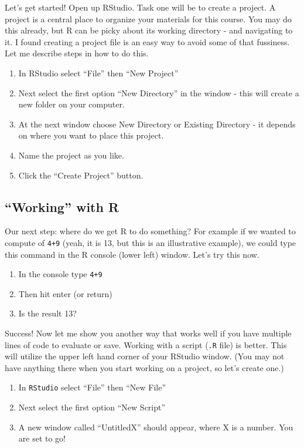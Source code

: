 \documentclass[
]{book}
\providecommand{\tightlist}{%
  \setlength{\itemsep}{0pt}\setlength{\parskip}{0pt}}
\theoremstyle{definition}
\theoremstyle{definition}
\theoremstyle{definition}
\theoremstyle{remark}
\begin{document}
Let's get started! Open up RStudio. Task one will be to create a project. A project is a central place to organize your materials for this course. You may do this already, but R can be picky about its working directory - and navigating to it. I found creating a project file is an easy way to avoid some of that fussiness. Let me describe steps in how to do this.

\begin{enumerate}
\def\labelenumi{\arabic{enumi}.}
\tightlist
\item
  In RStudio select ``File'' then ``New Project''
\item
  Next select the first option ``New Directory'' in the window - this will create a new folder on your computer.
\item
  At the next window choose New Directory or Existing Directory - it depends on where you want to place this project.
\item
  Name the project as you like.
\item
  Click the ``Create Project'' button.
\end{enumerate}

\hypertarget{working-with-r}{%
\subsection{``Working'' with R}\label{working-with-r}}

Our next step: where do we get R to do something? For example if we wanted to compute of \texttt{4+9} (yeah, it is 13, but this is an illustrative example), we could type this command in the R console (lower left) window. Let's try this now.

\begin{enumerate}
\def\labelenumi{\arabic{enumi}.}
\tightlist
\item
  In the console type \texttt{4+9}
\item
  Then hit enter (or return)
\item
  Is the result 13?
\end{enumerate}

Success! Now let me show you another way that works well if you have multiple lines of code to evaluate or save. Working with a script (\texttt{.R} file) is better. This will utilize the upper left hand corner of your RStudio window. (You may not have anything there when you start working on a project, so let's create one.)

\begin{enumerate}
\def\labelenumi{\arabic{enumi}.}
\tightlist
\item
  In \texttt{RStudio} select ``File'' then ``New File''
\item
  Next select the first option ``New Script''
\item
  A new window called ``UntitledX'' should appear, where X is a number. You are set to go!
\end{enumerate}
\end{document}
